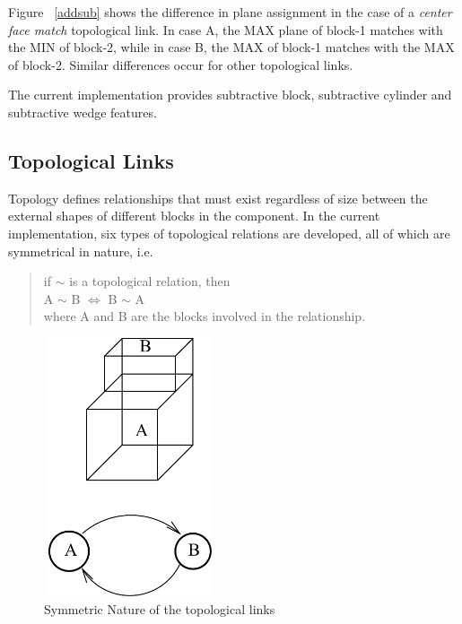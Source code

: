 	Figure ~\ref{addsub} shows the difference in plane assignment in the case of
	a {\em center face match} topological link. In case A, the MAX plane of 
	block-1
	matches with the MIN of block-2, while in case B, the MAX of block-1
	matches with the MAX of block-2. Similar differences occur for
	other topological links.	

	The current implementation provides subtractive block, subtractive cylinder
	and subtractive wedge features.


	\subsection{Topological Links }

	Topology defines relationships that must exist regardless of size between 
	the external shapes
	of different blocks in the component. In the current implementation, six 
	types of topological relations are developed, all of which are symmetrical
	in nature, i.e.
		\begin{quote}
		if $\sim$ is a topological relation, then \\
		A $\sim$ B $\Longleftrightarrow$ B $\sim$ A \\
		where A and B are the blocks involved in the relationship.

		\end{quote}

        \begin{figure}[htbp]
	\hspace{2.5cm}
	\includegraphics[width=2.0in,height=3.0in]{SYMM.pdf}
            \caption{Symmetric Nature of the topological links}
            \label{symm}
        \end{figure}

